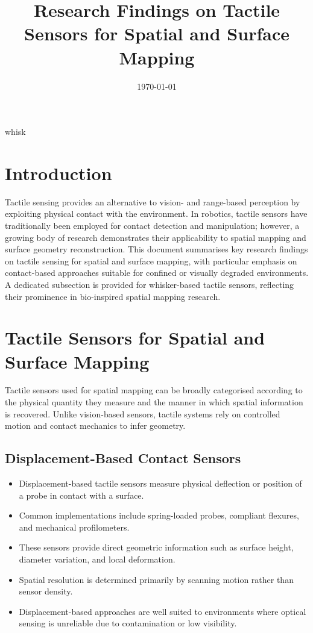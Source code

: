 whisk\documentclass[11pt,a4paper]{article}
\title{\textbf{Research Findings on Tactile Sensors for Spatial and Surface Mapping}}
\author{}
\date{\today}
\begin{document}
\maketitle

\section{Introduction}

Tactile sensing provides an alternative to vision- and range-based perception by exploiting physical contact with the environment. In robotics, tactile sensors have traditionally been employed for contact detection and manipulation; however, a growing body of research demonstrates their applicability to spatial mapping and surface geometry reconstruction. This document summarises key research findings on tactile sensing for spatial and surface mapping, with particular emphasis on contact-based approaches suitable for confined or visually degraded environments. A dedicated subsection is provided for whisker-based tactile sensors, reflecting their prominence in bio-inspired spatial mapping research.

\section{Tactile Sensors for Spatial and Surface Mapping}

Tactile sensors used for spatial mapping can be broadly categorised according to the physical quantity they measure and the manner in which spatial information is recovered. Unlike vision-based sensors, tactile systems rely on controlled motion and contact mechanics to infer geometry.

\subsection{Displacement-Based Contact Sensors}

\begin{itemize}
    \item Displacement-based tactile sensors measure physical deflection or position of a probe in contact with a surface.
    \item Common implementations include spring-loaded probes, compliant flexures, and mechanical profilometers.
    \item These sensors provide direct geometric information such as surface height, diameter variation, and local deformation.
    \item Spatial resolution is determined primarily by scanning motion rather than sensor density.
    \item Displacement-based approaches are well suited to environments where optical sensing is unreliable due to contamination or low visibility.
\end{itemize}
\end{document}
